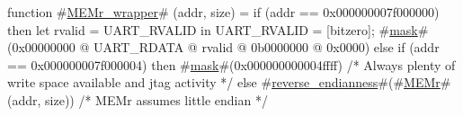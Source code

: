 function #\hyperref[zMEMrzywrapper]{MEMr\_wrapper}# (addr, size) =
    if (addr == 0x000000007f000000) then
      {
        let rvalid = UART_RVALID in
        {
          UART_RVALID = [bitzero];
          #\hyperref[zmask]{mask}#(0x00000000 @ UART_RDATA @ rvalid @ 0b0000000 @ 0x0000)
        }
      }
    else if (addr == 0x000000007f000004) then
      #\hyperref[zmask]{mask}#(0x000000000004ffff) /* Always plenty of write space available and jtag activity */
    else
      #\hyperref[zreversezyendianness]{reverse\_endianness}#(#\hyperref[zMEMr]{MEMr}#(addr, size)) /* MEMr assumes little endian */
